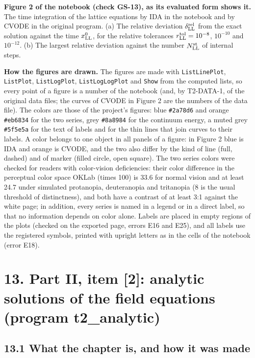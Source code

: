 \documentclass[
  10pt,
]{article}
\begin{document}
\textbf{Figure 2 of the notebook (check GS-13), as its evaluated form
shows it.} The time integration of the lattice equations by IDA in the
notebook and by CVODE in the original program. (a) The relative
deviation \(\delta^{\rm rel}_{\rm LL}\) from the exact solution against
the time \(x^0_{\rm LL}\), for the relative tolerances
\(r^{\rm tol}_{\rm LL}=10^{-8}\), \(10^{-10}\) and \(10^{-12}\). (b) The
largest relative deviation against the number \(N^{\rm st}_{\rm LL}\) of
internal steps.

\textbf{How the figures are drawn.} The figures are made with
\texttt{ListLinePlot}, \texttt{ListPlot}, \texttt{ListLogPlot},
\texttt{ListLogLogPlot} and \texttt{Show} from the computed lists, so
every point of a figure is a number of the notebook (and, by T2-DATA-1,
of the original data files; the curves of CVODE in Figure 2 are the
numbers of the data file). The colors are those of the project's
figures: blue \texttt{\#2a78d6} and orange \texttt{\#eb6834} for the two
series, grey \texttt{\#8a8984} for the continuum energy, a muted grey
\texttt{\#5f5e5a} for the text of labels and for the thin lines that
join curves to their labels. A color belongs to one object in all panels
of a figure: in Figure 2 blue is IDA and orange is CVODE, and the two
also differ by the kind of line (full, dashed) and of marker (filled
circle, open square). The two series colors were checked for readers
with color-vision deficiencies: their color difference in the perceptual
color space OKLab (times 100) is 33.6 for normal vision and at least
24.7 under simulated protanopia, deuteranopia and tritanopia (8 is the
usual threshold of distinctness), and both have a contrast of at least
3:1 against the white page; in addition, every series is named in a
legend or in a direct label, so that no information depends on color
alone. Labels are placed in empty regions of the plots (checked on the
exported page, errors E16 and E25), and all labels use the registered
symbols, printed with upright letters as in the cells of the notebook
(error E18).

\hypertarget{part-ii-item-2-analytic-solutions-of-the-field-equations-program-t2_analytic}{%
\section{13. Part II, item {[}2{]}: analytic solutions of the field
equations (program
t2\_analytic)}\label{part-ii-item-2-analytic-solutions-of-the-field-equations-program-t2_analytic}}

\hypertarget{what-the-chapter-is-and-how-it-was-made}{%
\subsection{13.1 What the chapter is, and how it was
made}\label{what-the-chapter-is-and-how-it-was-made}}
\end{document}
